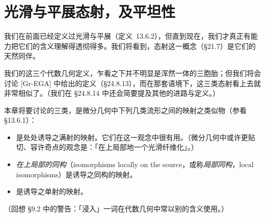 
\section{光滑与平展态射，及平坦性}

我们在前面已经定义过光滑\trMorphism{}与平展\trMorphism{}（\mbox{定义~13.6.2}），但直到现在，我们才真正有能力把它们的含义理解得透彻得多。我们将看到，\trUnramified{}态射这一概念（\S21.7）是它们的天然同伴。

我们的这三个代数几何定义，乍看之下并不明显是浑然一体的三胞胎；但我们将会讨论 [Gr-EGA] 中给出的定义（\S24.8.13），而在那套语境下，这三类态射看上去就非常相似了。（我们在 \S24.8.14 中还会简要提及其他的进路与定义。）

本章将要讨论的三类\trMorphism，是微分几何中下列几类流形之间的映射之类似物（参看 \S13.6.1）：
\begin{itemize}
\item \emph{\trSubmersion}是处处诱导\trTangentSpace{}之满射的映射。它们在\trFibration{}这一观念中很有用。（微分几何中或许更贴切、容许奇点的观念是：「在\trSource{}上局部地一个光滑纤维化」。）
\item \emph{在\trSource{}上局部的同构}（isomorphisms locally on the source，或称\emph{局部同构}，local isomorphisms）是诱导\trTangentSpace{}之同构的映射。
\item \emph{\trImmersion}是诱导\trTangentSpace{}之单射的映射。
\end{itemize}
（回想 \S9.2 中的警告：「浸入」一词在代数几何中常以别的含义使用。）

